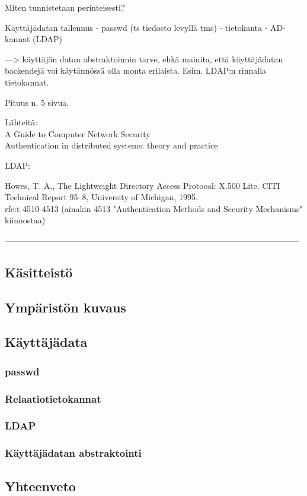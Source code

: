 Miten tunnistetaan perinteisesti?

Käyttäjädatan tallennus
- passwd (ts tiedosto levyllä tms)
- tietokanta
- AD-kannat (LDAP)

---> käyttäjän datan abstraktoinnin tarve, ehkä mainita, että käyttäjädatan backendejä voi käytännössä olla monta erilaista. Esim. LDAP:n rinnalla tietokannat.

Pituus n. 5 sivua.

Lähteitä:\\
A Guide to Computer Network Security \cite{authentication}\\
Authentication in distributed systems: theory and practice \cite{lampson}

LDAP:

Howes, T. A., The Lightweight Directory Access Protocol: X.500 Lite. CITI
Technical Report 95–8, University of Michigan, 1995. \cite{howes} \\
rfc:t 4510-4513 (ainakin 4513 "Authentication Methods and Security Mechanisms" kiinnostaa)

-----------------------------------------------------------------------------------------------------------


\subsection{Käsitteistö}

\subsection{Ympäristön kuvaus}

\subsection{Käyttäjädata}

\subsubsection{passwd}

\subsubsection{Relaatiotietokannat}

\subsubsection{LDAP}

\subsubsection{Käyttäjädatan abstraktointi}

\subsection{Yhteenveto}

